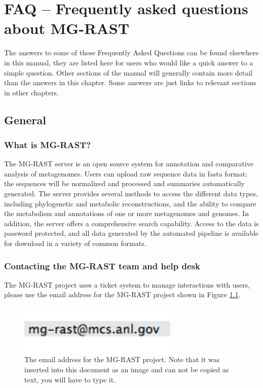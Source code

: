 \documentclass[12pt,fullpage]{report}
\begin{document}
\chapter{FAQ -- Frequently asked questions about MG-RAST}
The answers to some of these Frequently Asked Questions can be found elsewhere in this manual, they are listed here for users who would like  a quick answer to a simple question. Other sections of the manual will generally contain more detail than the answers in this chapter. Some answers are just links to relevant sections in other chapters.
\section{General}
\subsection*{What is MG-RAST?}
The MG-RAST server is an open source system for annotation and comparative analysis of metagenomes. Users can upload raw sequence data in fasta format; the sequences will be normalized and processed and summaries automatically generated. The server provides several methods to access the different data types, including phylogenetic and metabolic reconstructions, and the ability to compare the metabolism and annotations of one or more metagenomes and genomes. In addition, the server offers a comprehensive search capability. Access to the data is password protected, and all data generated by the automated pipeline is available for download in a variety of common formats.

\subsection*{Contacting the MG-RAST team and help desk}
\label{section:contact-mgrast}

The MG-RAST project uses a ticket system to manage interactions with users, please use the email address for the MG-RAST project shown in Figure \ref{fig:mgrastemail}.

\begin{figure}
\begin{center}
\includegraphics[width=3in]{Images/mgrastemail.png}
\end{center}
\caption{
The email address for the MG-RAST project. Note that it was inserted into this document as an image and can not be copied as text, you will have to type it.
}
\label{fig:mgrastemail}
\end{figure}
\end{document}
